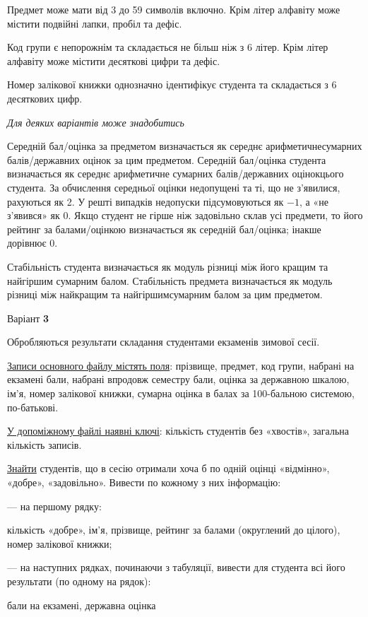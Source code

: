 \documentclass[11pt, ukrainian]{article}
\begin{document}
Предмет може мати від 3 до 59 символів включно. 
Крім літер алфавіту може містити подвійні лапки, пробіл та дефіс.

Код групи є непорожнім та складається не більш ніж з 6 літер. 
Крім літер алфавіту може містити десяткові цифри та дефіс.


Номер залікової книжки однозначно ідентифікує студента та складається з 6 десяткових цифр. 

\bigskip\textit{Для деяких варіантів може знадобитись}

Середній бал/оцінка за предметом визначається як середнє арифметичнесумарних балів/державних оцінок за цим предметом. 
Середній бал/оцінка студента визначається як середнє арифметичне сумарних балів/державних оцінокцього студента. 
За обчислення середньої оцінки недопущені та ті, що не з’явилися, рахуються як 2.
У решті випадків недопуски підсумовуються як $-1$, а «не з’явився» як 0.
Якщо студент не гірше ніж задовільно склав усі предмети, 
то його рейтинг за балами/оцінкою визначається як середній бал/оцінка; інакше дорівнює 0.

Стабільність студента визначається як модуль різниці між його кращим та найгіршим сумарним балом.
Стабільність предмета визначається як модуль різниці між найкращим та найгіршимсумарним балом за цим предметом.




\par
\newpage
{\center Варіант  \No \textbf { 3 }\par}
\bigskip
Обробляються результати складання студентами екзаменів зимової сесії.

\underline{Записи основного файлу містять поля}: прізвище, предмет, код групи, набрані на екзамені бали, набрані впродовж семестру бали, оцінка за державною шкалою, ім’я, номер залікової книжки, сумарна оцінка в балах за 100-бальною системою, по-батькові.

\underline{У допоміжному файлі наявні ключі}: кількість студентів без «хвостів», загальна кількість записів.

\underline{Знайти} студентів, що в сесію отримали хоча б по одній оцінці «відмінно», «добре», «задовільно». Вивести по кожному з них інформацію:\par
{\noindent}--- на першому рядку:\par
кількість «добре», ім’я, прізвище, рейтинг за балами (округлений до цілого), номер залікової книжки;

{\noindent}--- на наступних рядках, починаючи з табуляції, вивести для студента всі його результати (по одному на рядок):\par
бали на екзамені, державна оцінка
\end{document}
